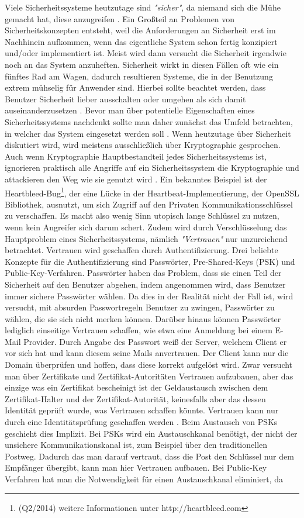 \documentclass[11pt,a4paper]{report}
\begin{document}
Viele Sicherheitssysteme heutzutage sind \textit{"sicher"}, da niemand sich die Mühe gemacht hat, diese anzugreifen \cite{gutmann0}. Ein Großteil an Problemen von Sicherheitskonzepten entsteht, weil die Anforderungen an Sicherheit erst im Nachhinein aufkommen, wenn das eigentliche System schon fertig konzipiert und/oder implementiert ist. Meist wird dann versucht die Sicherheit irgendwie noch an das System anzuheften. Sicherheit wirkt in diesen Fällen oft wie ein fünftes Rad am Wagen, dadurch resultieren Systeme, die in der Benutzung extrem mühselig für Anwender sind. Hierbei sollte beachtet werden, dass Benutzer Sicherheit lieber ausschalten oder umgehen als sich damit auseinanderzusetzen \cite{gutmann5}. Bevor man über potentielle Eigenschaften eines Sicherheitssystems nachdenkt sollte man daher zunächst das Umfeld betrachten, in welcher das System eingesetzt werden soll \cite{gutmann4}. Wenn heutzutage über Sicherheit diskutiert wird, wird meistens ausschließlich über Kryptographie gesprochen. Auch wenn Kryptographie Hauptbestandteil jedes Sicherheitssystems ist, ignorieren praktisch alle Angriffe auf ein Sicherheitssystem die Kryptographie und attackieren den Weg wie sie genutzt wird \cite{gutmann1}. Ein bekanntes Beispiel ist der Heartbleed-Bug\footnote{(Q2/2014) weitere Informationen unter http://heartbleed.com}, der eine Lücke in der Heartbeat-Implementierung, der OpenSSL Bibliothek, ausnutzt, um sich Zugriff auf den Privaten Kommunikationsschlüssel zu verschaffen. Es macht also wenig Sinn utopisch lange Schlüssel zu nutzen, wenn kein Angreifer sich darum schert. Zudem wird durch Verschlüsselung das Hauptproblem eines Sicherheitssystems, nämlich \textit{"Vertrauen"} nur unzureichend betrachtet. Vertrauen wird geschaffen durch Authentifizierung. Drei beliebte Konzepte für die Authentifizierung sind Passwörter, Pre-Shared-Keys (PSK) und Public-Key-Verfahren. Passwörter haben das Problem, dass sie einen Teil der Sicherheit auf den Benutzer abgehen, indem angenommen wird, dass Benutzer immer sichere Passwörter wählen. Da dies in der Realität nicht der Fall ist, wird versucht, mit absurden Passwortregeln Benutzer zu zwingen, Passwörter zu wählen, die sie sich nicht merken können. Darüber hinaus können Passwörter lediglich einseitige Vertrauen schaffen, wie etwa eine Anmeldung bei einem E-Mail Provider. Durch Angabe des Passwort weiß der Server, welchem Client er vor sich hat und kann diesem seine Mails anvertrauen. Der Client kann nur die Domain überprüfen und hoffen, dass diese korrekt aufgelöst wird. Zwar versucht man über Zertifikate und Zertifikat-Autoritäten Vertrauen aufzubauen, aber das einzige was ein Zertifikat bescheinigt ist der Geldaustausch zwischen dem Zertifikat-Halter und der Zertifikat-Autorität, keinesfalls aber das dessen Identität geprüft wurde, was Vertrauen schaffen könnte. Vertrauen kann nur durch eine Identitätsprüfung geschaffen werden \cite{gutmann8}. Beim Austausch von PSKs geschieht dies Implizit. Bei PSKs wird ein Austauschkanal benötigt, der nicht der unsichere Kommunikationskanal ist, zum Beispiel über den traditionellen Postweg. Dadurch das man darauf vertraut, dass die Post den Schlüssel nur dem Empfänger übergibt, kann man hier Vertrauen aufbauen. Bei Public-Key Verfahren hat man die Notwendigkeit für einen Austauschkanal eliminiert, da 
\end{document}
